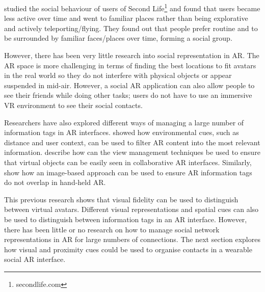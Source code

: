 \textcite{Harris2009} studied the social behaviour of users of Second Life\footnote{secondlife.com} and found that users became less active over time and went to familiar places rather than being explorative and actively teleporting/flying. They found out that people prefer routine and to be surrounded by familiar faces/places over time, forming a social group.

However, there has been very little research into social representation in AR. The AR space is more challenging in terms of finding the best locations to fit avatars in the real world so they do not interfere with physical objects or appear suspended in mid-air. However, a social AR application can also allow people to see their friends while doing other tasks; users do not have to use an immersive VR environment to see their social contacts.

Researchers have also explored different ways of managing a large number of information tags in AR interfaces. \textcite{Julier2002} showed how environmental cues, such as distance and user context, can be used to filter AR content into the most relevant information. \textcite{Hollerer2001} describe how can the view management techniques be used to ensure that virtual objects can be easily seen in collaborative AR interfaces. Similarly, \textcite{Grasset2012} show how an image-based approach can be used to ensure AR information tags do not overlap in hand-held AR. 

This previous research shows that visual fidelity can be used to distinguish between virtual avatars. Different visual representations and spatial cues can also be used to distinguish between information tags in an AR interface. However, there has been little or no research on how to manage social network representations in AR for large numbers of connections. The next section explores how visual and proximity cues could be used to organise contacts in a wearable social AR interface.



